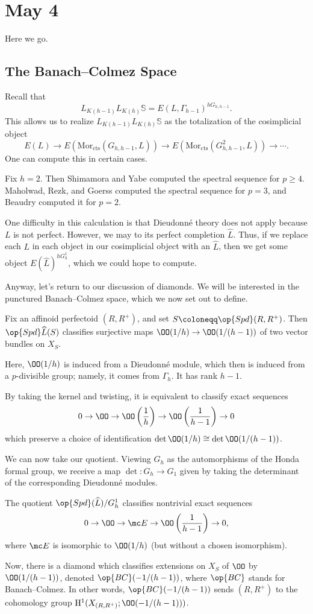 \documentclass[../notes.tex]{subfiles}
\begin{document}
\section{May 4}
Here we go.

\subsection{The Banach--Colmez Space}
Recall that
\[L_{K(h-1)}L_{K(h)}\mathbb S=E(L,\Gamma_{h-1})^{hG_{h,h-1}}.\]
This allows us to realize $L_{K(h-1)}L_{K(h)}\mathbb S$ as the totalization of the cosimplicial object
\[E(L)\to E(\mathrm{Mor}_{\mathrm{cts}}(G_{h,h-1},L))\to E(\mathrm{Mor}_{\mathrm{cts}}(G_{h,h-1}^2,L))\to\cdots.\]
One can compute this in certain cases.
\begin{remark}
	Fix $h=2$. Then Shimamora and Yabe computed the spectral sequence for $p\ge4$. Maholwad, Rezk, and Goerss computed the spectral sequence for $p=3$, and Beaudry computed it for $p=2$.
\end{remark}
One difficulty in this calculation is that Dieudonn\'e theory does not apply because $L$ is not perfect. However, we may to its perfect completion $\widehat L$. Thus, if we replace each $L$ in each object in our cosimplicial object with an $\widehat L$, then we get some object $E(\widehat L)^{hG^1_h}$, which we could hope to compute.

Anyway, let's return to our discussion of diamonds. We will be interested in the punctured Banach--Colmez space, which we now set out to define.
\begin{theorem}
	Fix an affinoid perfectoid $(R,R^+)$, and set $S\coloneqq\op{Spd}(R,R^+)$. Then $\op{Spd}\widehat L(S)$ classifies surjective maps $\OO(1/h)\to\OO(1/(h-1))$ of two vector bundles on $X_S$.
\end{theorem}
\begin{remark}
	Here, $\OO(1/h)$ is induced from a Dieudonn\'e module, which then is induced from a $p$-divisible group; namely, it comes from $\Gamma_h$. It has rank $h-1$.
\end{remark}
\begin{remark}
	By taking the kernel and twisting, it is equivalent to classify exact sequences
	\[0\to\OO\to\OO\left(\frac1h\right)\to\OO\left(\frac1{h-1}\right)\to0\]
	which preserve a choice of identification $\det\OO(1/h)\cong\det\OO(1/(h-1))$.
\end{remark}
We can now take our quotient. Viewing $G_h$ as the automorphisms of the Honda formal group, we receive a map $\det\colon G_h\to G_1$ given by taking the determinant of the corresponding Dieudonn\'e modules.
\begin{corollary}
	The quotient $\op{Spd}(\widehat L)/G_h^1$ classifies nontrivial exact sequences
	\[0\to\OO\to\mc E\to\OO\left(\frac1{h-1}\right)\to0,\]
	where $\mc E$ is isomorphic to $\OO(1/h)$ (but without a chosen isomorphism).
\end{corollary}
Now, there is a diamond which classifies extensions on $X_S$ of $\OO$ by $\OO(1/(h-1))$, denoted $\op{BC}(-1/(h-1))$, where $\op{BC}$ stands for Banach--Colmez. In other words, $\op{BC}(-1/(h-1))$ sends $(R,R^+)$ to the cohomology group $\mathrm H^1(X_{(R,R^+)};\OO(-1/(h-1)))$.
\end{document}
